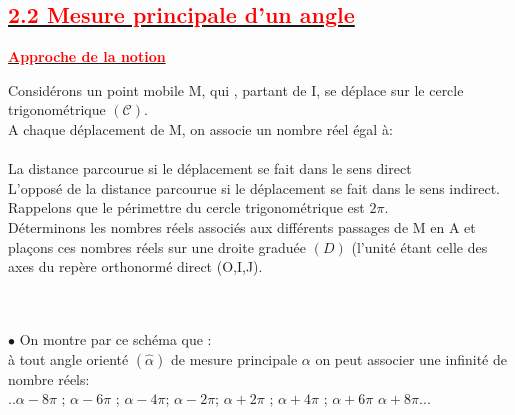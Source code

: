 \documentclass[12pt]{article}
\begin{document}
\subsection*{\underline{\textbf{\textcolor{red}{2.2 Mesure principale d'un angle}}}}
\underline{\textbf{\textcolor{red}{Approche de la notion}}}\\


Considérons un point mobile M, qui , partant de I, se déplace sur le cercle trigonométrique $(\mathcal{C})$.\\
A chaque déplacement de M, on associe un nombre réel égal à:\\
\\
La distance parcourue si le déplacement se fait dans le sens direct\\
L'opposé de la distance parcourue si le déplacement se fait dans le sens indirect.\\
Rappelons que le périmettre du cercle trigonométrique est $2\pi$.\\
Déterminons les nombres réels associés aux différents passages de M en A et plaçons ces nombres réels sur une droite graduée $(D)$ (l'unité étant celle des axes du repère orthonormé direct (O,I,J).\\
\\
\\
$\bullet$ On montre par ce schéma que :\\
à tout angle orienté $(\hat{\alpha})$ de mesure principale $\alpha$ on peut associer une infinité de nombre réels:\\
..$\alpha - 8\pi $ ; $\alpha - 6\pi $ ; $\alpha - 4\pi $; $\alpha - 2\pi $; $\alpha + 2\pi $ ; $\alpha + 4\pi $ ; $\alpha + 6\pi $ $\alpha + 8\pi $...\\
\end{document}
